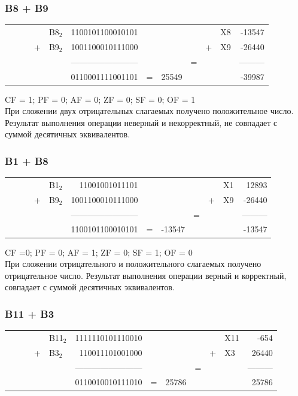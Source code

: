 \documentclass[11pt]{article}
\begin{document}
\subsubsection{B8 + B9}
\label{sec:orgd545b27}
\setlength{\tabcolsep}{3pt}
\label{tab:org57f8c4a}
\begin{tabular}{lllllrlllllr}
 &  &  &  & B8\(_{\text{2}}\) & 1100101100010101 &  &  &  &  & X8 & -13547\\
 &  &  & + & B9\(_{\text{2}}\) & 1001100010111000 &  &  &  & + & X9 & -26440\\
 &  &  &  &  & ------------------------ &  &  & = &  &  & ---------\\
 &  &  &  &  & 0110001111001101 & = & 25549 &  &  &  & -39987\\
\end{tabular}

CF = 1; PF = 0; AF = 0; ZF = 0; SF = 0; OF = 1\\
При сложении двух отрицательных слагаемых получено положительное число. Результат выполнения операции неверный и некорректный, не совпадает с суммой десятичных эквивалентов.

\subsubsection{B1 + B8}
\label{sec:org308dbef}
\setlength{\tabcolsep}{3pt}
\label{tab:org251e359}
\begin{tabular}{lllllrlllllr}
 &  &  &  & B1\(_{\text{2}}\) & 11001001011101 &  &  &  &  & X1 & 12893\\
 &  &  & + & B9\(_{\text{2}}\) & 1001100010111000 &  &  &  & + & X9 & -26440\\
 &  &  &  &  & ------------------------ &  &  & = &  &  & ---------\\
 &  &  &  &  & 1100101100010101 & = & -13547 &  &  &  & -13547\\
\end{tabular}

CF =0; PF = 0; AF = 1; ZF = 0; SF = 1; OF = 0\\
При сложении отрицательного и положительного слагаемых получено отрицательное число. Результат выполнения операции верный и корректный, совпадает с суммой десятичных эквивалентов.

\subsubsection{B11 + B3}
\label{sec:org1ade089}
\setlength{\tabcolsep}{3pt}
\label{tab:org3c9470d}
\begin{tabular}{lllllrlllllr}
 &  &  &  & B11\(_{\text{2}}\) & 1111110101110010 &  &  &  &  & X11 & -654\\
 &  &  & + & B3\(_{\text{2}}\) & 110011101001000 &  &  &  & + & X3 & 26440\\
 &  &  &  &  & ------------------------ &  &  & = &  &  & ---------\\
 &  &  &  &  & 0110010010111010 & = & 25786 &  &  &  & 25786\\
\end{tabular}
\end{document}
